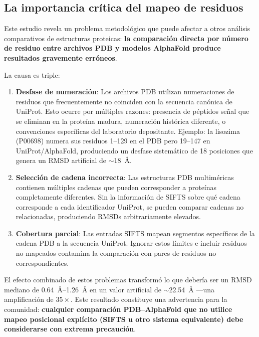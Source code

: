 \subsection{La importancia cr\'itica del mapeo de residuos}
\label{subsec:importancia_mapeo}

Este estudio revela un problema metodol\'ogico que puede afectar a otros an\'alisis
comparativos de estructuras proteicas: \textbf{la comparaci\'on directa por n\'umero
de residuo entre archivos PDB y modelos AlphaFold produce resultados gravemente err\'oneos}.

La causa es triple:

\begin{enumerate}
    \item \textbf{Desfase de numeraci\'on}: Los archivos PDB utilizan numeraciones de
    residuos que frecuentemente no coinciden con la secuencia can\'onica de UniProt. Esto
    ocurre por m\'ultiples razones: presencia de p\'eptidos se\~nal que se eliminan en la
    prote\'ina madura, numeraci\'on hist\'orica diferente, o convenciones espec\'ificas
    del laboratorio depositante. Ejemplo: la lisozima (P00698) numera sus residuos
    1--129 en el PDB pero 19--147 en UniProt/AlphaFold, produciendo un desfase
    sistem\'atico de 18 posiciones que genera un RMSD artificial de $\sim$\SI{18}{\angstrom}.

    \item \textbf{Selecci\'on de cadena incorrecta}: Las estructuras PDB multim\'ericas
    contienen m\'ultiples cadenas que pueden corresponder a prote\'inas completamente
    diferentes. Sin la informaci\'on de SIFTS sobre qu\'e cadena corresponde a cada
    identificador UniProt, se pueden comparar cadenas no relacionadas,
    produciendo RMSDs arbitrariamente elevados.

    \item \textbf{Cobertura parcial}: Las entradas SIFTS mapean segmentos espec\'ificos
    de la cadena PDB a la secuencia UniProt. Ignorar estos l\'imites e incluir residuos
    no mapeados contamina la comparaci\'on con pares de residuos no correspondientes.
\end{enumerate}

El efecto combinado de estos problemas transform\'o lo que deber\'ia ser un RMSD
mediano de \SI{0,64}{\angstrom}--\SI{1,26}{\angstrom} en un valor artificial de
$\sim$\SI{22,54}{\angstrom} ---una amplificaci\'on de $35\times$. Este resultado
constituye una advertencia para la comunidad: \textbf{cualquier comparaci\'on
PDB--AlphaFold que no utilice mapeo posicional expl\'icito (SIFTS u otro sistema
equivalente) debe considerarse con extrema precauci\'on}.

